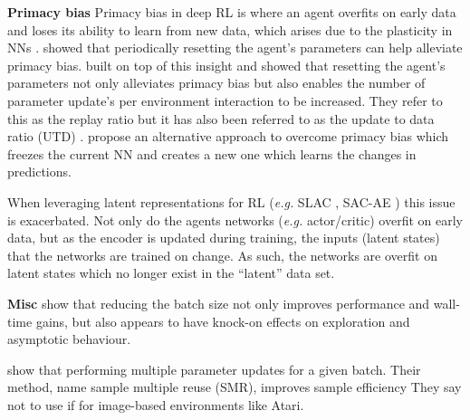 \documentclass{article}
\makeatletter
\theoremstyle{plain}
\theoremstyle{definition}
\theoremstyle{remark}
\newcommand{\eg}{\textit{e.g.\@}\xspace}
\makeatother
\begin{document}




\textbf{Primacy bias}
Primacy bias in deep RL \citep{nikishinPrimacyBiasDeep2022}
is where an agent overfits on early data and loses its ability to learn from new data,
which arises due to the plasticity in NNs \citep{lyleUnderstandingPlasticityNeural2023} .
\citet{nikishinPrimacyBiasDeep2022} showed that periodically resetting the agent's parameters can help alleviate primacy bias.
\citet{doroSampleEfficientReinforcementLearning2022} built on top of this insight and showed that resetting the
agent's parameters not only alleviates primacy bias but also
enables the number of parameter update's per environment interaction to be increased.
They refer to this as the replay ratio but it has also been referred to as the update to data
ratio (UTD) \citep{chenRandomizedEnsembledDouble2021}.
\citet{nikishinDeepReinforcementLearning2023} propose an alternative approach to overcome primacy bias which
freezes the current NN and creates a new one which learns the changes in predictions.


When leveraging latent representations for RL (\eg SLAC \citep{leeStochasticLatentActorCritic2020},
SAC-AE \citep{yaratsImprovingSampleEfficiency2021}) this issue is exacerbated.
Not only do the agents networks (\eg actor/critic) overfit on early data, but as the encoder is updated during training, the
inputs (latent states) that the networks are trained on change.
As such, the networks are overfit on latent states which no longer exist in the ``latent'' data set.



\textbf{Misc}
\citet{obando-ceronSmallBatchDeep2023a} show that reducing the batch size not only improves
performance and wall-time gains, but also appears to have knock-on effects on exploration and asymptotic behaviour.

\citet{lyuOffPolicyRLAlgorithms2023} show that performing multiple parameter updates for a given batch.
Their method, name sample multiple reuse (SMR), improves sample efficiency
They say not to use if for image-based environments like Atari.
\end{document}
